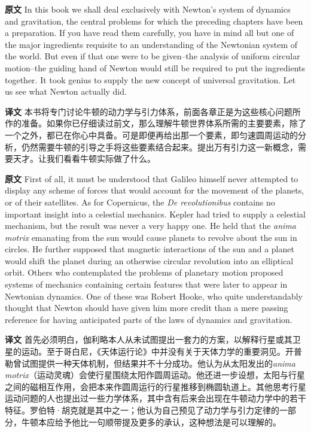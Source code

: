 \documentclass[UTF8,zihao=-4]{ctexart}
\begin{document}
\noindent\textbf{原文} In this book we shall deal exclusively with Newton's system of dynamics and gravitation, the central problems for which the preceding chapters have been a preparation. If you have read them carefully, you have in mind all but one of the major ingredients requisite to an understanding of the Newtonian system of the world. But even if that one were to be given--the analysis of uniform circular motion--the guiding hand of Newton would still be required to put the ingredients together. It took genius to supply the new concept of universal gravitation. Let us see what Newton actually did.
\par\noindent\textbf{译文} 本书将专门讨论牛顿的动力学与引力体系，前面各章正是为这些核心问题所作的准备。如果你已仔细读过前文，那么理解牛顿世界体系所需的主要要素，除了一个之外，都已在你心中具备。可是即便再给出那一个要素，即匀速圆周运动的分析，仍然需要牛顿的引导之手将这些要素结合起来。提出万有引力这一新概念，需要天才。让我们看看牛顿实际做了什么。
\medskip

\noindent\textbf{原文} First of all, it must be understood that Galileo himself never attempted to display any scheme of forces that would account for the movement of the planets, or of their satellites. As for Copernicus, the \emph{De revolutionibus} contains no important insight into a celestial mechanics. Kepler had tried to supply a celestial mechanism, but the result was never a very happy one. He held that the \emph{anima motrix} emanating from the sun would cause planets to revolve about the sun in circles. He further supposed that magnetic interactions of the sun and a planet would shift the planet during an otherwise circular revolution into an elliptical orbit. Others who contemplated the problems of planetary motion proposed systems of mechanics containing certain features that were later to appear in Newtonian dynamics. One of these was Robert Hooke, who quite understandably thought that Newton should have given him more credit than a mere passing reference for having anticipated parts of the laws of dynamics and gravitation.
\par\noindent\textbf{译文} 首先必须明白，伽利略本人从未试图提出一套力的方案，以解释行星或其卫星的运动。至于哥白尼，《天体运行论》中并没有关于天体力学的重要洞见。开普勒曾试图提供一种天体机制，但结果并不十分成功。他认为从太阳发出的\emph{anima motrix}（运动灵魂）会使行星围绕太阳作圆周运动。他还进一步设想，太阳与行星之间的磁相互作用，会把本来作圆周运行的行星推移到椭圆轨道上。其他思考行星运动问题的人也提出过一些力学体系，其中含有后来会出现在牛顿动力学中的若干特征。罗伯特·胡克就是其中之一；他认为自己预见了动力学与引力定律的一部分，牛顿本应给予他比一句顺带提及更多的承认，这种想法是可以理解的。
\medskip
\end{document}
